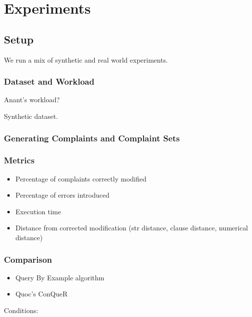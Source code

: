 \section{Experiments}

%
%

\subsection{Setup}


We run a mix of synthetic and real world experiments.

\subsubsection{Dataset and Workload}

Anant's workload?

Synthetic dataset.


\subsubsection{Generating Complaints and Complaint Sets}



\subsubsection{Metrics}

\begin{itemize}
\item Percentage of complaints correctly modified
\item Percentage of errors introduced
\item Execution time
\item Distance from corrected modification (str distance, clause distance, numerical distance)
\end{itemize}

\subsubsection{Comparison}

\begin{itemize}
\item Query By Example algorithm
\item Quoc's ConQueR
\end{itemize}

Conditions:

